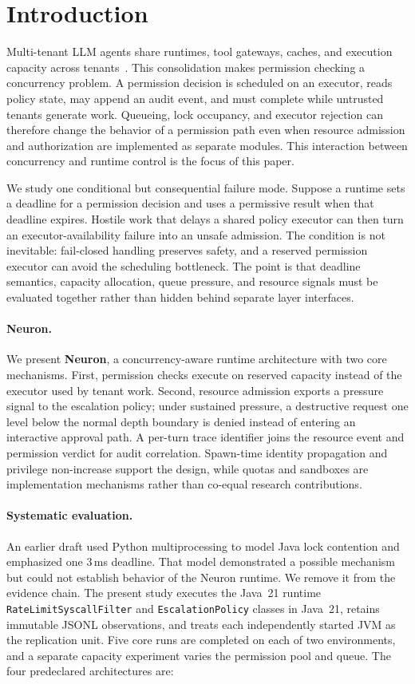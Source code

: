 \section{Introduction}
\label{sec:intro}

Multi-tenant LLM agents share runtimes, tool gateways, caches, and execution
capacity across tenants~\cite{mei2025aios,wu2023autogen}. This consolidation
makes permission checking a concurrency problem. A permission decision is
scheduled on an executor, reads policy state, may append an audit event, and
must complete while untrusted tenants generate work. Queueing, lock occupancy,
and executor rejection can therefore change the behavior of a permission
path even when resource admission and authorization are implemented as
separate modules. This interaction between concurrency and runtime control is
the focus of this paper.

We study one conditional but consequential failure mode. Suppose a runtime
sets a deadline for a permission decision and uses a permissive result when
that deadline expires. Hostile work that delays a shared policy executor can
then turn an executor-availability failure into an unsafe admission. The
condition is not inevitable: fail-closed handling preserves safety, and a
reserved permission executor can avoid the scheduling bottleneck. The point is
that deadline semantics, capacity allocation, queue pressure, and resource
signals must be evaluated together rather than hidden behind separate layer
interfaces.

\paragraph{Neuron.}
We present \textbf{Neuron}, a concurrency-aware runtime architecture with two core
mechanisms. First, permission checks execute on reserved capacity instead of
the executor used by tenant work. Second, resource admission exports a
pressure signal to the escalation policy; under sustained pressure, a
destructive request one level below the normal depth boundary is denied
instead of entering an interactive approval path. A per-turn trace identifier
joins the resource event and permission verdict for audit correlation.
Spawn-time identity propagation and privilege non-increase support the design,
while quotas and sandboxes are implementation mechanisms rather than
co-equal research contributions.

\paragraph{Systematic evaluation.}
An earlier draft used Python multiprocessing to model Java lock contention and
emphasized one 3\,ms deadline. That model demonstrated a possible mechanism
but could not establish behavior of the Neuron runtime. We remove it from the
evidence chain. The present study executes the Java~21 runtime
\texttt{RateLimitSyscallFilter} and \texttt{EscalationPolicy} classes in
Java~21, retains immutable JSONL observations, and treats each independently
started JVM as the replication unit. Five core runs are completed on each of
two environments, and a separate capacity experiment varies the permission
pool and queue. The four predeclared architectures are:

